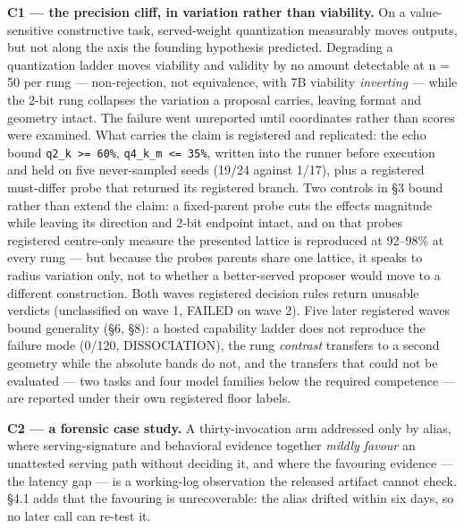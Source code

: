 \textbf{C1 --- the precision cliff, in variation rather than viability.} On a value-sensitive constructive task, served-weight quantization measurably moves outputs, but not along the axis the founding hypothesis predicted. Degrading a quantization ladder moves viability and validity by no amount detectable at n = 50 per rung --- non-rejection, not equivalence, with 7B viability \emph{inverting} --- while the 2-bit rung collapses the variation a proposal carries, leaving format and geometry intact. The failure went unreported until coordinates rather than scores were examined. What carries the claim is registered and replicated: the echo bound \texttt{q2\_k\ \textgreater{}=\ 60\%}, \texttt{q4\_k\_m\ \textless{}=\ 35\%}, written into the runner before execution and held on five never-sampled seeds (19/24 against 1/17), plus a registered must-differ probe that returned its registered branch. Two controls in §3 bound rather than extend the claim: a fixed-parent probe cuts the effect\textquotesingle s magnitude while leaving its direction and 2-bit endpoint intact, and on that probe\textquotesingle s registered centre-only measure the presented lattice is reproduced at 92--98\% at every rung --- but because the probe\textquotesingle s parents share one lattice, it speaks to radius variation only, not to whether a better-served proposer would move to a different construction. Both waves\textquotesingle{} registered decision rules return unusable verdicts (unclassified on wave 1, FAILED on wave 2). Five later registered waves bound generality (§6, §8): a hosted capability ladder does not reproduce the failure mode (0/120, DISSOCIATION), the rung \emph{contrast} transfers to a second geometry while the absolute bands do not, and the transfers that could not be evaluated --- two tasks and four model families below the required competence --- are reported under their own registered floor labels.

\textbf{C2 --- a forensic case study.} A thirty-invocation arm addressed only by alias, where serving-signature and behavioral evidence together \emph{mildly favour} an unattested serving path without deciding it, and where the favouring evidence --- the latency gap --- is a working-log observation the released artifact cannot check. §4.1 adds that the favouring is unrecoverable: the alias drifted within six days, so no later call can re-test it.

